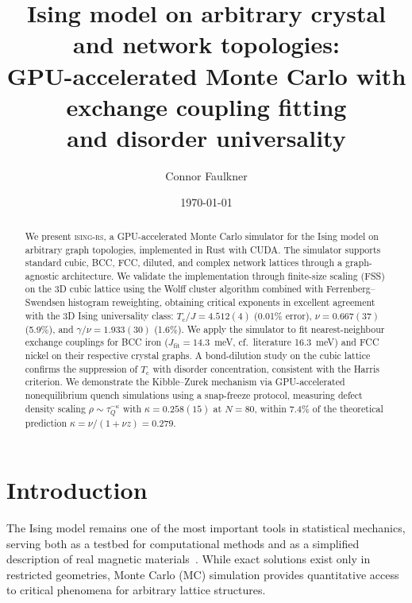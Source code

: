\documentclass[twocolumn,showpacs,preprintnumbers,amsmath,amssymb,pra,floatfix]{revtex4-2}
\newcommand{\Tc}{T_{\mathrm{c}}}
\begin{document}
\title{Ising model on arbitrary crystal and network topologies:\\
GPU-accelerated Monte Carlo with exchange coupling fitting\\
and disorder universality}

\author{Connor Faulkner}

\date{\today}

\begin{abstract}
We present \textsc{ising-rs}, a GPU-accelerated Monte Carlo simulator for the Ising model
on arbitrary graph topologies, implemented in Rust with CUDA. The simulator supports
standard cubic, BCC, FCC, diluted, and complex network lattices through a graph-agnostic
architecture. We validate the implementation through finite-size scaling (FSS) on the
3D cubic lattice using the Wolff cluster algorithm combined with Ferrenberg--Swendsen
histogram reweighting, obtaining critical exponents in excellent agreement with the
3D Ising universality class: $\Tc/J = 4.512(4)$ (0.01\% error),
$\nu = 0.667(37)$ (5.9\%), and $\gamma/\nu = 1.933(30)$ (1.6\%).
We apply the simulator to fit nearest-neighbour exchange couplings for BCC iron
($J_{\mathrm{fit}} = 14.3$~meV, cf.\ literature 16.3~meV) and FCC nickel on their
respective crystal graphs. A bond-dilution study on the cubic lattice confirms the
suppression of $\Tc$ with disorder concentration, consistent with the Harris criterion.
We demonstrate the Kibble--Zurek mechanism via GPU-accelerated nonequilibrium quench
simulations using a snap-freeze protocol, measuring defect density scaling
$\rho \sim \tau_Q^{-\kappa}$ with $\kappa = 0.258(15)$ at $N=80$, within 7.4\% of the
theoretical prediction $\kappa = \nu/(1+\nu z) = 0.279$.
\end{abstract}

\maketitle

\section{Introduction}
\label{sec:intro}

The Ising model remains one of the most important tools in statistical mechanics,
serving both as a testbed for computational methods and as a simplified description
of real magnetic materials~\cite{Onsager1944,Wilson1971}. While exact solutions exist
only in restricted geometries, Monte Carlo (MC) simulation provides quantitative access
to critical phenomena for arbitrary lattice structures.
\end{document}
